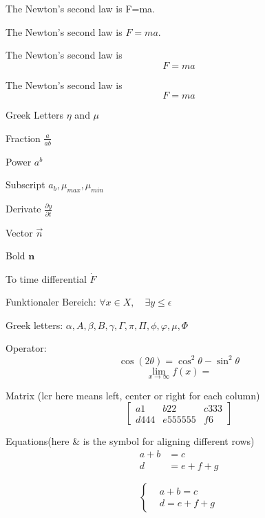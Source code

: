 \documentclass{article}
\begin{document}
  The Newton's second law is F=ma.

  The Newton's second law is $F=ma$.

  The Newton's second law is
  $$F=ma$$

  The Newton's second law is
  \[F=ma\]

  Greek Letters $\eta$ and $\mu$

  Fraction $\frac{a}{ab}$

  Power $a^b$

  Subscript $a_b, \mu_{max}, \mu_{min}$

  Derivate $\frac{\partial y}{\partial t} $

  Vector $\vec{n}$

  Bold $\mathbf{n}$

  To time differential $\dot{F}$
  
  Funktionaler Bereich: $\forall x \in X, \quad\exists y\leq \epsilon$
  
  Greek letters: $\alpha, A, \beta, B, \gamma, \Gamma, \pi, \Pi, \phi, \varphi, \mu, \Phi$
  
  Operator: $$\cos(2\theta) = \cos^2\theta - \sin^2\theta$$
            $$\lim_{x\to\infty} f(x) = $$
              

  Matrix (lcr here means left, center or right for each column)
  \[
    \left[
      \begin{array}{lcr}
        a1 & b22 & c333 \\
        d444 & e555555 & f6
      \end{array}
    \right]
  \]

Equations(here \& is the symbol for aligning different rows)
\begin{align}
  a+b&=c\\
  d&=e+f+g
\end{align}

\[
  \left\{
    \begin{aligned}
      &a+b=c\\
      &d=e+f+g
    \end{aligned}
  \right.
\]
\end{document}
